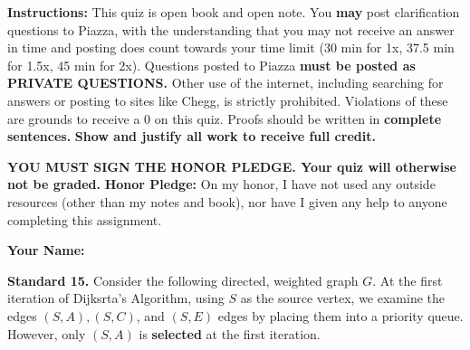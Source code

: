 \documentclass[11pt]{article}
\begin{document}
\renewcommand{\headrulewidth}{0.5pt}

\phantom{Test}

\begin{small}
\noindent \textbf{Instructions:} This quiz is open book and open note. You \textbf{may} post clarification questions to Piazza, with the understanding that you may not receive an answer in time and posting does count towards your time limit (30 min for 1x, 37.5 min for 1.5x, 45 min for 2x). Questions posted to Piazza \textbf{must be posted as PRIVATE QUESTIONS.} Other use of the internet, including searching for answers or posting to sites like Chegg, is strictly prohibited. Violations of these are grounds to receive a 0 on this quiz. Proofs should be written in \textbf{complete sentences.} \textbf{Show and justify all work to receive full credit.} 

\noindent \textbf{YOU MUST SIGN THE HONOR PLEDGE. Your quiz will otherwise not be graded.}  
\noindent \textbf{Honor Pledge:} On my honor, I have not used any outside resources (other than my notes and book), nor have I given any help to anyone completing this assignment. 

\noindent \textbf{Your Name:} \underline{\hskip 250pt}\end{small} 

\hrulefill 

\noindent  \textbf{Standard 15.} Consider the following directed, weighted graph $G$. At the first iteration of Dijksrta's Algorithm, using $S$ as the source vertex, we examine the edges $(S, A), (S, C)$, and $(S, E)$ edges by placing them into a priority queue. However, only $(S, A)$ is \textbf{selected} at the first iteration. 
\end{document}
